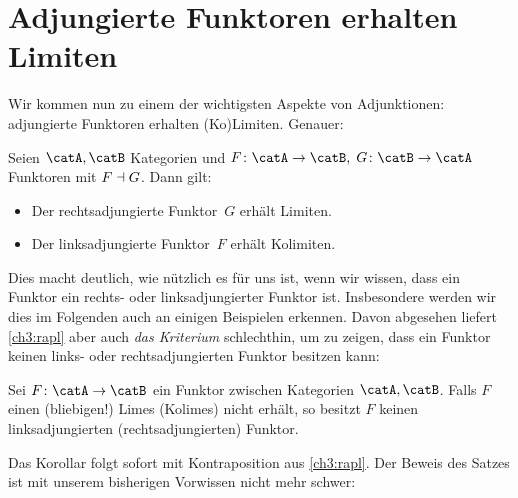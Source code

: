 \chapter{Adjungierte Funktoren erhalten Limiten}
Wir kommen nun zu einem der wichtigsten Aspekte von Adjunktionen: adjungierte
Funktoren erhalten (Ko)Limiten. Genauer:

\begin{thSatz}
    \label{ch3:rapl}
    Seien $\catA,\catB$ Kategorien und $F\colon\catA\to\catB,\;
    G\colon\catB\to\catA$ Funktoren mit $F\dashv G$.
    Dann gilt:
    \begin{itemize}
        \item
            Der rechtsadjungierte Funktor~$G$ erhält Limiten.
        \item
            Der linksadjungierte Funktor~$F$ erhält Kolimiten.
    \end{itemize}
\end{thSatz}

Dies macht deutlich, wie nützlich es für uns ist, wenn wir wissen, dass ein
Funktor ein rechts- oder linksadjungierter Funktor ist. Insbesondere werden wir
dies im Folgenden auch an einigen Beispielen erkennen. Davon abgesehen liefert
\cref{ch3:rapl} aber auch \emph{das Kriterium} schlechthin, um zu zeigen, dass
ein Funktor keinen links- oder rechtsadjungierten Funktor besitzen kann:

\begin{thKorollar}
    \label{ch3:raplkontra}
    Sei $F\colon\catA\to\catB$ ein Funktor zwischen Kategorien $\catA,\catB$.
    Falls $F$ einen (bliebigen!) Limes (Kolimes) nicht erhält, 
    so besitzt $F$ keinen linksadjungierten (rechtsadjungierten) Funktor.
\end{thKorollar}

Das Korollar folgt sofort mit Kontraposition aus \cref{ch3:rapl}. Der Beweis des
Satzes ist mit unserem bisherigen Vorwissen nicht mehr schwer:

